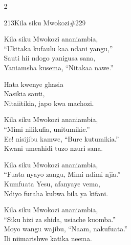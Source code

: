 \begin{multicols}{2}
\begin{hymn}{213}{Kila siku Mwokozi}{\#229}
\begin{stanza}
Kila siku Mwokozi ananiambia,\\
``Ukitaka kufaulu kaa ndani yangu,''\\
Sauti hii ndogo yanigusa sana,\\
Yaniamsha kusema, ``Nitakaa nawe.''
\end{stanza}
\begin{chorus}
Hata kwenye ghasia\\
Nasikia sauti,\\
Nitaiitikia, japo kwa machozi.
\end{chorus}
\begin{stanza}
Kila siku Mwokozi ananiambia,\\
``Mimi nilikufia, unitumikie.''\\
Ee! nisijibu kamwe, ``Bure kutumikia.''\\
Kwani umeahidi tuzo nzuri sana.
\end{stanza}
\begin{stanza}
Kila siku Mwokozi ananiambia,\\
``Fuata nyayo zangu, Mimi ndimi njia.''\\
Kumfuata Yesu, afanyaye vema,\\
Ndiyo furaha kubwa bila ya kifani.
\end{stanza}
\begin{stanza}
Kila siku Mwokozi ananiambia,\\
``Siku hizi za shida, usiache kuomba.''\\
Moyo wangu wajibu, ``Naam, nakufuata.''\\
Ili niimarishwe katika neema.
\end{stanza}
\end{hymn}


\end{multicols}

